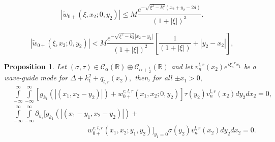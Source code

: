 \documentclass[10pt,a4paper]{amsart}
\newtheorem{proposition}{Proposition}
\newcommand\bbR{\mathbb R}
\newcommand\cC{\mathcal{C}}
\newcommand\pa{\partial}
\newcommand\tw{\tilde w_{0+}}
\begin{document}
    \begin{equation}\label{eqn73.9}
      |\tw(\xi,x_2;0,y_2)|\leq M\frac{e^{-\sqrt{\xi^2-k_1^2}(x_2+y_2-2d)}}{(1+|\xi|)^{3}}.
    \end{equation}

   \begin{equation}\label{eqn92.9}
     |\tw(\xi,x_2;0,y_2)|<M\frac{e^{-\sqrt{\xi^2-k_2^2}|x_2-y_2|}}{(1+|\xi|)^2}\left[\frac{1}{(1+|\xi|)}+|y_2-x_2|\right],
   \end{equation}

\begin{proposition}\label{prop2.94}
  Let $(\sigma,\tau)\in \cC_{\alpha}(\bbR)\oplus\cC_{\alpha+\frac 12}(\bbR)$ and
  let $v_{n}^{l,r}(x_2)e^{i\xi_n^{l,r}x_1}$ be a wave-guide mode for
  $\Delta+k_1^2+q_{l,r}(x_2),$ then, for all  $\pm x_1>0,$ 
  \begin{equation}
    \begin{split}
     &\int\limits_{-\infty}^{\infty}\int\limits_{-\infty}^{\infty}[g_{k_1}(|(x_1,x_2-y_2)|)+
        w^{c;l,r}_{0+}(x_1,x_2;0,y_2)]\tau(y_2)v_n^{l,r}(x_2)dy_2dx_2=0,\\
     &\int\limits_{-\infty}^{\infty}\int\limits_{-\infty}^{\infty}\pa_{y_1}[g_{k_1}(|(x_1-y_1,x_2-y_2)|)+\\
        &\phantom{mmmmmmmmmmmm}w^{c;l,r}_{0+}(x_1,x_2;y_1,y_2)]_{y_1=0}\sigma(y_2)v_n^{l,r}(x_2)dy_2dx_2=0.
    \end{split}
  \end{equation}
\end{proposition}
\end{document}
